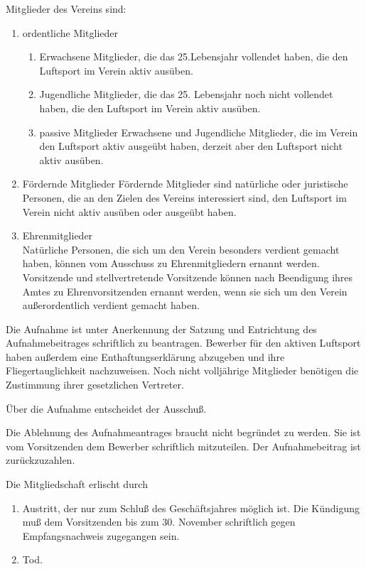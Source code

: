 \documentclass[11pt,a4paper,parskip=half]{scrartcl}
\begin{document}
\begin{contract}
\begin{multicols}{2}
    Mitglieder des Vereins sind:
    \begin{enumerate}
      \item ordentliche Mitglieder
    \begin{enumerate}
      \item Erwachsene Mitglieder,
      die das 25.Lebensjahr vollendet haben,
      die den Luftsport im Verein aktiv
      ausüben.
      \item Jugendliche Mitglieder,
      die das 25. Lebensjahr noch nicht vollendet haben,
      die den Luftsport im Verein aktiv ausüben.
      \item{passive Mitglieder} Erwachsene und Jugendliche Mitglieder,
      die im Verein den Luftsport aktiv ausgeübt haben,
      derzeit aber den Luftsport nicht aktiv ausüben.
    \end{enumerate}
  \item{Fördernde Mitglieder} Fördernde Mitglieder sind natürliche oder juristische Personen,
    die an den Zielen des Vereins interessiert sind,
    den Luftsport im Verein nicht aktiv ausüben oder ausgeübt haben.


    \item{Ehrenmitglieder}\\
    Natürliche Personen,
    die sich um den Verein besonders verdient gemacht haben,
    können vom Ausschuss zu Ehrenmitgliedern ernannt werden.
    Vorsitzende und stellvertretende Vorsitzende können nach Beendigung ihres Amtes zu Ehrenvorsitzenden ernannt werden,
    wenn sie sich um den Verein außerordentlich verdient gemacht haben.
  \end{enumerate}

    Die Aufnahme ist unter Anerkennung der Satzung und Entrichtung des Aufnahmebeitrages schriftlich zu beantragen.
    Bewerber für den aktiven Luftsport haben außerdem eine Enthaftungserklärung abzugeben und ihre Fliegertauglichkeit nachzuweisen.
    Noch nicht volljährige Mitglieder benötigen die Zustimmung ihrer gesetzlichen Vertreter.

    Über die Aufnahme entscheidet der Ausschuß.

    Die Ablehnung des Aufnahmeantrages braucht nicht begründet zu werden.
    Sie ist vom Vorsitzenden dem Bewerber schriftlich mitzuteilen.
    Der Aufnahmebeitrag ist zurückzuzahlen.

    Die Mitgliedschaft erlischt durch
    \begin{enumerate}[label=\alph*)]
    \item Austritt,
    der nur zum Schluß des Geschäftsjahres möglich ist.
    Die Kündigung muß dem Vorsitzenden bis zum 30. November schriftlich gegen Empfangsnachweis zugegangen sein.
    \item Tod.


\end{enumerate}
\end{multicols}
\end{contract}
\end{document}
